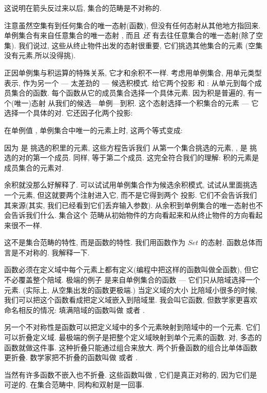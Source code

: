这说明在箭头反过来以后, 集合的范畴是不对称的.

注意虽然空集有到任何集合的唯一态射(函数), 但没有任何态射从其他地方指回来. 单例集合有来自任意集合的唯一态射
, 而且 \emph{还} 有去往任意集合的唯一态射(除了空集). 我们说过, 这些从终止物件出发的态射很重要, 它们挑选其他集合的元素
(空集没有元素,所以没得挑).

正因单例集与积运算的特殊关系, 它才和余积不一样. 考虑用单例集合, 用单元类型 \code{()} 表示, 作为另一个 --- 太差劲的 ---
候选积模式. 给它两个投影  和 : 从单元到每个成员集合的函数. 每个函数从它的成员集合选择一个具体元素.
因为积是普遍的, 有一个(唯一)态射  从我们的候选---单例---到积. 这个态射选择一个积集合的元素 --- 它选择一个具体的对.
它还因子化两个投影:

在单例值 \code{()}, 单例集合中唯一的元素上时, 这两个等式变成:

因为  是  挑选的积里的元素, 这些方程告诉我们  从第一个集合挑选的元素, ,
是  挑选的对的第一个成员. 同样,  等于第二个成员. 这完全符合我们的理解: 积的元素是成员集合的元素对.

余积就没那么好解释了. 可以试试用单例集合作为候选余积模式, 试试从里面挑选一个元素, 但这就要两个注射进入它, 而不是它得到两个
投影. 它们不会告诉我们其来源(其实, 我们已经看到它们丢弃输入参数). 从余积到单例集合的唯一态射也不会告诉我们什么. 集合这个
范畴从初始物件的方向看起来和从终止物件的方向看起来很不一样.

这不是集合范畴的特性, 而是函数的特性. 我们用函数作为 $Set$ 的态射. 函数总体而言是不对称的. 我解释一下.

函数必须在定义域中每个元素上都有定义(编程中把这样的函数叫做全函数), 但它不必覆盖整个陪域. 极端的例子
是来自单例集合的函数 --- 它们只从陪域选择一个元素. (实际上, 从空集出发的函数更极端.) 当定义域的大小
比陪域小很多的时候, 我们可以把这个函数看成把定义域嵌入到陪域里. 我会叫它函数,
但数学家更喜欢命名相反的情况: 填满陪域的函数叫做  或者 .

另一个不对称性是函数可以把定义域中的多个元素映射到陪域中的一个元素. 它们可以折叠定义域.
最极端的例子是把整个定义域映射到单个元素的函数. 对, 多态的  函数就做这件事.
这种折叠只能通过组合来放大. 两个折叠函数的组合比单体函数更折叠. 数学家把不折叠的函数叫做
 或者 .

当然有许多函数不嵌入也不折叠. 这些函数叫做 , 它们是真正对称的, 因为它们是可逆的.
在集合范畴中, 同构和双射是一回事.

